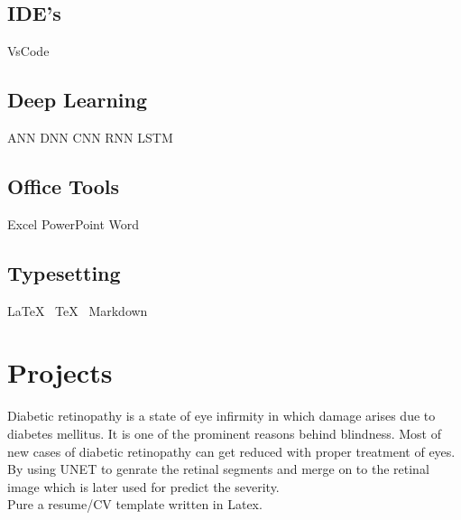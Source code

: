 \documentclass[]{charan}
\begin{document}
\vspace{.8em}
\begin{minipage}[t]{.35\textwidth}
\subsection{IDE's }
VsCode
\end{minipage}
\hfill
\begin{minipage}[t]{.6\textwidth}
\subsection{Deep Learning}
ANN \textbullet{} DNN \textbullet{} CNN \textbullet{} RNN \textbullet{} LSTM 
\end{minipage}

\vspace{.8em}
\begin{minipage}[t]{.35\textwidth}
\subsection{Office Tools }
Excel \textbullet{} PowerPoint \textbullet{} Word
\end{minipage}
\hfill
\begin{minipage}[t]{.6\textwidth}
\subsection{Typesetting}
\LaTeX\  \textbullet{} \TeX\  \textbullet{} Markdown
\end{minipage}

\vspace{8em} %
\section{Projects}

\descript{}
Diabetic retinopathy is a state of eye infirmity in which damage arises due to diabetes mellitus. It is one of the prominent reasons behind blindness. Most of new cases of diabetic retinopathy can get reduced with proper treatment of eyes. By using UNET to genrate the retinal segments and merge on to the retinal image which is later used for predict the severity. \\
\sectionsep
{}
\vspace{0.3em}
\descript{}
Pure a resume/CV template written in Latex. \\
\sectionsep 
\end{document}
